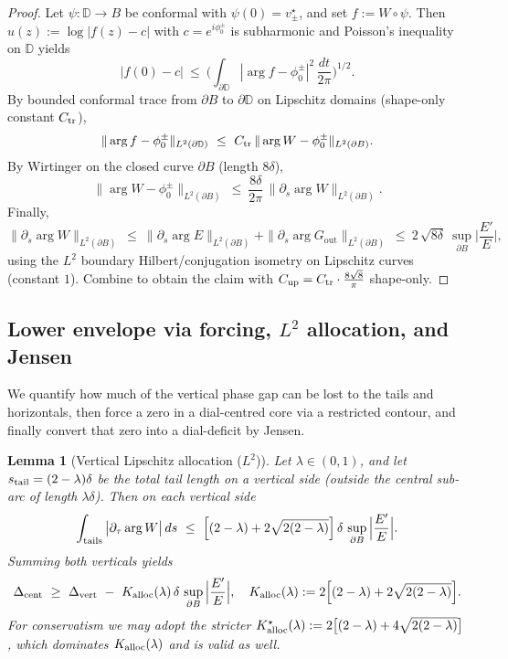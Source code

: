 \documentclass[11pt]{article}
\numberwithin{equation}{section}
\newtheorem{lemma}[theorem]{Lemma}
\theoremstyle{remark}
\newcommand{\D}{\mathbb{D}}
\newcommand{\Gout}{G_{\mathrm{out}}}
\begin{document}
\begin{proof}
Let $\psi:\D\to B$ be conformal with $\psi(0)=v_\pm^\star$, and set $f:=W\circ\psi$. Then $u(z):=\log|f(z)-c|$ with $c=e^{i\phi_0^\pm}$ is subharmonic and Poisson’s inequality on $\D$ yields
\[
|f(0)-c|\ \le\ \Big(\int_{\partial\D}|\arg f-\phi_0^\pm|^2\,\frac{dt}{2\pi}\Big)^{1/2}.
\]
By bounded conformal trace from $\partial B$ to $\partial\D$ on Lipschitz domains (shape-only constant $C_{\rm tr}$),
\[
\|\arg f-\phi_0^\pm\|_{L^2(\partial\D)}\ \le\ C_{\rm tr}\,\|\arg W-\phi_0^\pm\|_{L^2(\partial B)}.
\]
By Wirtinger on the closed curve $\partial B$ (length $8\delta$),
\[
\|\arg W-\phi_0^\pm\|_{L^2(\partial B)}\ \le\ \frac{8\delta}{2\pi}\,\|\partial_s\arg W\|_{L^2(\partial B)}.
\]
Finally,
\[
\|\partial_s\arg W\|_{L^2(\partial B)}\ \le\ \|\partial_s\arg E\|_{L^2(\partial B)}+\|\partial_s\arg \Gout\|_{L^2(\partial B)}
\ \le\ 2\,\sqrt{8\delta}\ \sup_{\partial B}\Big|\frac{E'}{E}\Big|,
\]
using the $L^2$ boundary Hilbert/conjugation isometry on Lipschitz curves (constant $1$). Combine to obtain the claim with $C_{\mathrm{up}}=C_{\rm tr}\cdot\frac{8\sqrt{8}}{\pi}$ shape-only.
\end{proof}

\subsection{Lower envelope via forcing, $L^2$ allocation, and Jensen}\label{subsec:lower-new}

We quantify how much of the vertical phase gap can be lost to the tails and horizontals, then force a zero in a dial-centred core via a restricted contour, and finally convert that zero into a dial-deficit by Jensen.

\begin{lemma}[Vertical Lipschitz allocation ($L^2$)]\label{lem:allocL2}
Let $\lambda\in(0,1)$, and let $s_{\rm tail}=(2-\lambda)\delta$ be the total tail length on a vertical side (outside the central sub-arc of length $\lambda\delta$). Then on each vertical side
\[
\int_{\textup{tails}} \big|\partial_\tau \arg W\big|\,ds
\ \le\ \Big[(2-\lambda)+2\sqrt{2(2-\lambda)}\Big]\,\delta\,\sup_{\partial B}\Big|\frac{E'}{E}\Big|.
\]
Summing both verticals yields
\[
\Delta_{\rm cent}\ \ge\ \Delta_{\rm vert}\ -\ K_{\rm alloc}(\lambda)\,\delta\,\sup_{\partial B}\Big|\frac{E'}{E}\Big|,
\quad
K_{\rm alloc}(\lambda):=2\Big[(2-\lambda)+2\sqrt{2(2-\lambda)}\Big].
\]
For conservatism we may adopt the stricter $K_{\rm alloc}^{\star}(\lambda):=2\big[(2-\lambda)+4\sqrt{2(2-\lambda)}\big]$, which dominates $K_{\rm alloc}(\lambda)$ and is valid as well.
\end{lemma}
\end{document}
